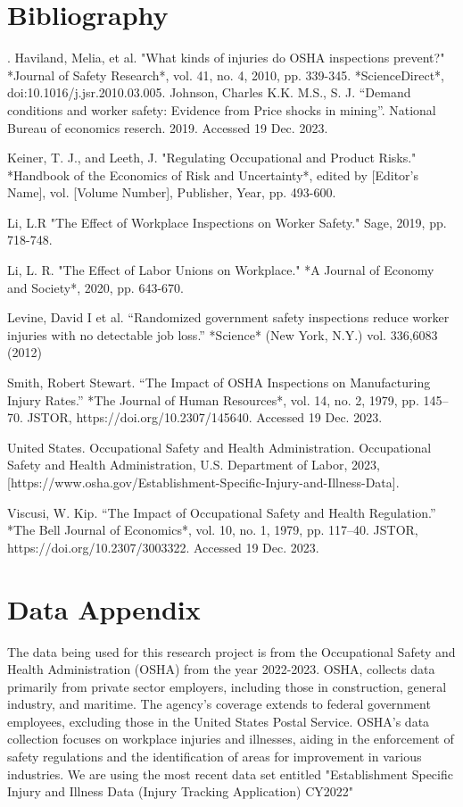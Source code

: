 \documentclass[12pt]{article}
\begin{document}
\newpage
\section{Bibliography}
\doublespacing
\setlength\bibsep{0pt}
\indent .
\indent Haviland, Melia, et al. "What kinds of injuries do OSHA inspections prevent?" *Journal of Safety Research*, vol. 41, no. 4, 2010, pp. 339-345. *ScienceDirect*, doi:10.1016/j.jsr.2010.03.005.
\indent Johnson, Charles K.K. M.S., S. J. “Demand conditions and worker safety: Evidence from Price shocks in mining”. National Bureau of economics reserch. 2019. Accessed 19 Dec. 2023.  

\indent Keiner, T. J., and Leeth, J. "Regulating Occupational and Product Risks." *Handbook of the Economics of Risk and Uncertainty*, edited by [Editor's Name], vol. [Volume Number], Publisher, Year, pp. 493-600. 

\indent Li, L.R "The Effect of Workplace Inspections on Worker Safety." Sage, 2019, pp. 718-748. 

\indent Li, L. R. "The Effect of Labor Unions on Workplace." *A Journal of Economy and Society*, 2020, pp. 643-670. 

\indent  Levine, David I et al. “Randomized government safety inspections reduce worker injuries with no detectable job loss.” *Science* (New York, N.Y.) vol. 336,6083 (2012)

\indent  Smith, Robert Stewart. “The Impact of OSHA Inspections on Manufacturing Injury Rates.” *The Journal of Human Resources*, vol. 14, no. 2, 1979, pp. 145–70. JSTOR, https://doi.org/10.2307/145640. Accessed 19 Dec. 2023. 

\indent United States. Occupational Safety and Health Administration. Occupational Safety and Health Administration, U.S. Department of Labor, 2023, [https://www.osha.gov/Establishment-Specific-Injury-and-Illness-Data]. 

\indent  Viscusi, W. Kip. “The Impact of Occupational Safety and Health Regulation.” *The Bell Journal of Economics*, vol. 10, no. 1, 1979, pp. 117–40. JSTOR, https://doi.org/10.2307/3003322. Accessed 19 Dec. 2023.


\newpage
\section*{ Data Appendix} \label{sec:appendixa}

The data being used for this research project is from the Occupational Safety and Health Administration (OSHA) from the year 2022-2023. OSHA, collects data primarily from private sector employers, including those in construction, general industry, and maritime. The agency's coverage extends to federal government employees, excluding those in the United States Postal Service. OSHA's data collection focuses on workplace injuries and illnesses, aiding in the enforcement of safety regulations and the identification of areas for improvement in various industries. We are using the most recent data set entitled "Establishment Specific Injury and Illness Data (Injury Tracking Application) CY2022"
\end{document}
